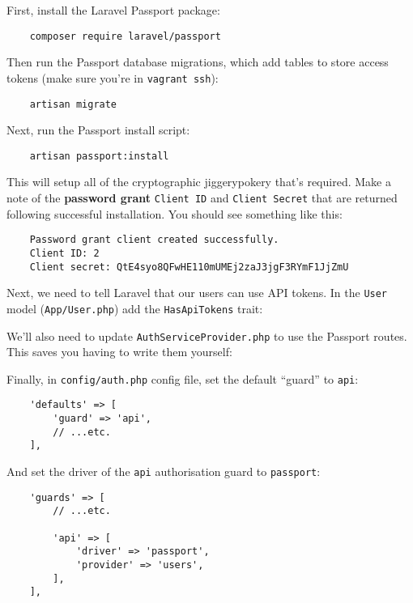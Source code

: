 First, install the Laravel Passport package:

\begin{verbatim}
    composer require laravel/passport
\end{verbatim}

Then run the Passport database migrations, which add tables to store access tokens (make sure you're in \texttt{vagrant ssh}):

\begin{verbatim}
    artisan migrate
\end{verbatim}

Next, run the Passport install script:

\begin{verbatim}
    artisan passport:install
\end{verbatim}

This will setup all of the cryptographic jiggerypokery that's required. Make a note of the \textbf{password grant} \texttt{Client ID} and \texttt{Client Secret} that are returned following successful installation. You should see something like this:

\begin{verbatim}
    Password grant client created successfully.
    Client ID: 2
    Client secret: QtE4syo8QFwHE110mUMEj2zaJ3jgF3RYmF1JjZmU
\end{verbatim}

Next, we need to tell Laravel that our users can use API tokens. In the \texttt{User} model (\texttt{App/User.php}) add the \texttt{HasApiTokens} trait:



We'll also need to update \texttt{AuthServiceProvider.php} to use the Passport routes. This saves you having to write them yourself:



Finally, in \texttt{config/auth.php} config file, set the default ``guard'' to \texttt{api}:

\begin{verbatim}
    'defaults' => [
        'guard' => 'api',
        // ...etc.
    ],
\end{verbatim}

And set the driver of the \texttt{api} authorisation guard to \texttt{passport}:

\begin{verbatim}
    'guards' => [
        // ...etc.

        'api' => [
            'driver' => 'passport',
            'provider' => 'users',
        ],
    ],
\end{verbatim}

